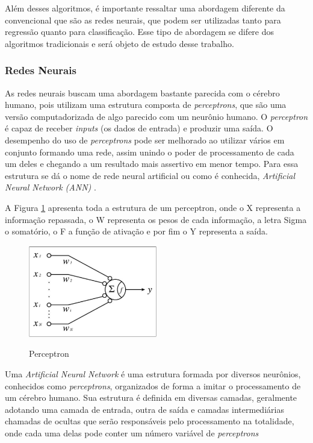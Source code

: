 Além desses algoritmos, é importante ressaltar uma abordagem diferente da convencional que são as redes neurais, que podem ser utilizadas tanto para regressão quanto para classificação. Esse tipo de abordagem se difere dos algoritmos tradicionais e será objeto de estudo desse trabalho.

\subsubsection{Redes Neurais}
\label{sec:redesneurais}

As redes neurais buscam uma abordagem bastante parecida com o cérebro humano, pois utilizam uma estrutura composta de \emph{perceptrons}, que são uma versão computadorizada de algo parecido com um neurônio humano. O \emph{perceptron} é capaz de receber \emph{inputs} (os dados de entrada) e produzir uma saída. O desempenho do uso de \emph{perceptrons} pode ser melhorado ao utilizar vários em conjunto formando uma rede, assim unindo o poder de processamento de cada um deles e chegando a um resultado mais assertivo em menor tempo. Para essa estrutura se dá o nome de rede neural artificial ou como é conhecida, \emph{Artificial Neural Network (ANN)} \cite{deepLearning, deepLearningTensorFlow}.

A Figura \ref{fig:perceptron} apresenta toda a estrutura de um perceptron, onde o X representa a informação repassada, o W representa os pesos de cada informação, a letra Sigma o somatório, o F a função de ativação e por fim o Y representa a saída.

\begin{figure}[!htb]
	\centering
	\caption{Perceptron}
	\includegraphics[width=0.50\textwidth]{img/perceptron.jpg}
	\label{fig:perceptron}
\end{figure}

Uma \emph{Artificial Neural Network} é uma estrutura formada por diversos neurônios, conhecidos como \emph{perceptrons}, organizados de forma a imitar o processamento de um cérebro humano. Sua estrutura é definida em diversas camadas, geralmente adotando uma camada de entrada, outra de saída e camadas intermediárias chamadas de ocultas que serão responsáveis pelo processamento na totalidade, onde cada uma delas pode conter um número variável de \emph{perceptrons} \cite{deepLearningTensorFlow}

